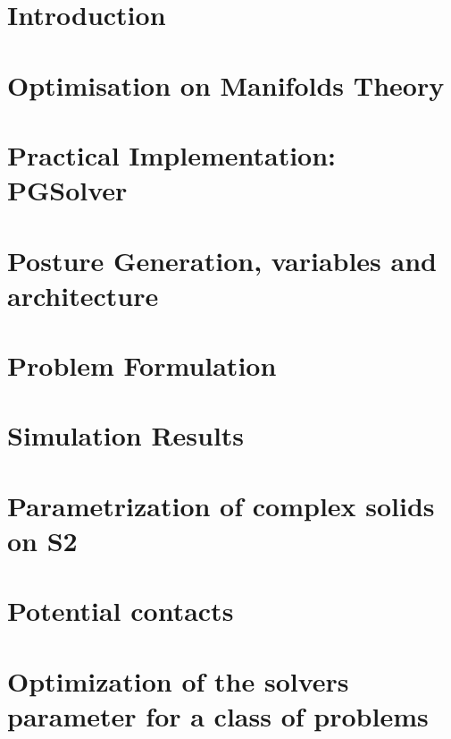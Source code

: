 \section{Introduction}
\label{sec:Introduction}

\section{Optimisation on Manifolds Theory}
\label{sec:Optimisation on Manifolds Theory}

\section{Practical Implementation: PGSolver}
\label{sec:Practical Implementation}

\section{Posture Generation, variables and architecture}
\label{sec:posture_generation_variables_and_architecture}

\section{Problem Formulation}
\label{sec:problem_formulation}

\section{Simulation Results}
\label{sec:simulation_results}

\section{Parametrization of complex solids on S2}
\label{sec:parametrization_of_complex_solids_on_s2}

\section{Potential contacts}
\label{sec:potential_contacts}

\section{Optimization of the solvers parameter for a class of problems}
\label{sec:optimization_of_the_solvers_parameter_for_a_class_of_problems}

